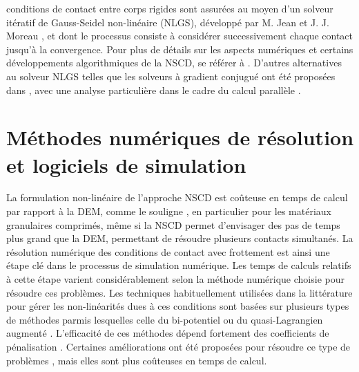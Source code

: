 conditions de contact entre corps rigides sont assurées au moyen d'un solveur itératif de Gauss-Seidel non-linéaire (NLGS), développé par M. Jean et J. J. Moreau \cite{jean1992unilaterality,moreau1994numerical,jean1999non,moreau1999sweeping}, et dont le processus consiste à considérer successivement chaque contact jusqu'à la convergence. Pour plus de détails sur les aspects numériques et certains développements algorithmiques de la NSCD, se référer à \cite{acary2008numerical,dubois2018contact,fortin2005numerical,jean1992unilaterality,jean1999non}. D'autres alternatives au solveur NLGS telles que les solveurs à gradient conjugué ont été proposées dans \cite{renouf2005conjugate}, avec une analyse particulière dans le cadre du calcul parallèle \cite{renouf2004parallel,visseq2013high}.

\section{Méthodes numériques de résolution et logiciels de simulation}

La formulation non-linéaire de l'approche NSCD est coûteuse en temps de calcul par rapport à la DEM, comme le souligne \cite{dubois2018contact}, en particulier pour les matériaux granulaires comprimés, même si la NSCD permet d'envisager des pas de temps plus grand que la DEM, permettant de résoudre plusieurs contacts simultanés. La résolution numérique des conditions de contact avec frottement est ainsi une étape clé dans le processus de simulation numérique. Les temps de calculs relatifs à cette étape varient considérablement selon la méthode numérique choisie pour résoudre ces problèmes. Les techniques habituellement utilisées dans la littérature pour gérer les non-linéarités dues à ces conditions sont basées sur plusieurs types de méthodes parmis lesquelles celle du bi-potentiel \cite{feng2005bi, joli2008uzawa,dumont2013enhanced} ou du quasi-Lagrangien augmenté \cite{de1991new, fortin2005numerical}. L'efficacité de ces méthodes dépend fortement des coefficients de pénalisation \cite{alart1991mixed, fortin2002improved, fortin2005numerical}. Certaines améliorations ont été proposées pour résoudre ce type de problèmes \cite{dumont2013enhanced, joli2008uzawa}, mais elles sont plus coûteuses en temps de calcul.\\

